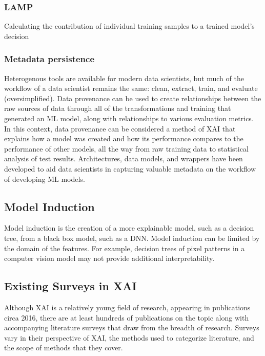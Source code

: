 \subsubsection{LAMP}

Calculating the contribution of individual training samples to a trained model's decision \cite{Ma2017}

\subsubsection{Metadata persistence} Heterogenous tools are available for modern data scientists, but much of the workflow of a data scientist remains the same:  clean, extract, train, and evaluate (oversimplified).  Data provenance can be used to create relationships between the raw sources of data through all of the transformations and training that generated an ML model, along with relationships to various evaluation metrics.  In this context, data provenance can be considered a method of XAI that explains how a model was created and how its performance compares to the performance of other models, all the way from raw training data to statistical analysis of test results.  Architectures, data models, and wrappers have been developed to aid data scientists in capturing valuable metadata on the workflow of developing ML models.

\subsection{Model Induction}

Model induction is the creation of a more explainable model, such as a decision tree, from a black box model, such as a DNN.  Model induction can be limited by the domain of the features.  For example, decision trees of pixel patterns in a computer vision model may not provide additional interpretability.

\subsection{Existing Surveys in XAI}

Although XAI is a relatively young field of research, appearing in publications circa 2016, there are at least hundreds of publications on the topic along with accompanying literature surveys that draw from the breadth of research.  Surveys vary in their perspective of XAI, the methods used to categorize literature, and the scope of methods that they cover.

